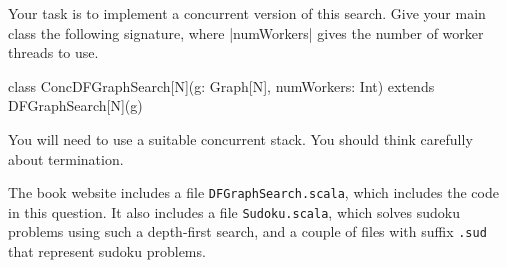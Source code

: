 \begin{question}
Your task is to implement a concurrent version of this search.  Give your main
class the following signature, where |numWorkers| gives the number of worker
threads to use.
%
\begin{scala}
class ConcDFGraphSearch[N](g: Graph[N], numWorkers: Int)
    extends DFGraphSearch[N](g)
\end{scala}
%
You will need to use a suitable concurrent stack.  You should think carefully
about termination.

The book website includes a file \texttt{DFGraphSearch.scala}, which includes
the code in this question.  It also includes a file \texttt{Sudoku.scala},
which solves sudoku problems using such a depth-first search, and a couple of
files with suffix \texttt{.sud} that represent sudoku problems.
\end{question}


